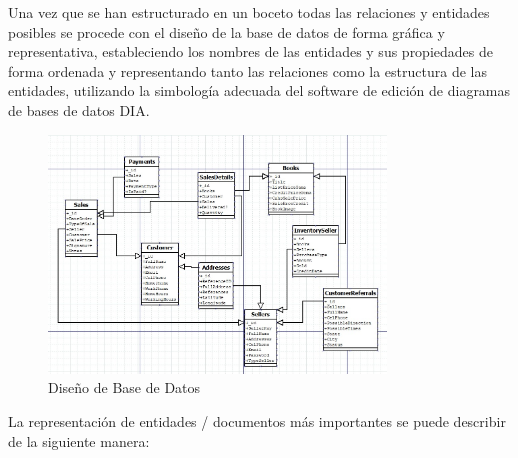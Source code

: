 \documentclass[runningheads]{llncs}
\begin{document}
                Una vez que se han estructurado en un boceto todas las relaciones y entidades posibles se procede con el diseño de la base de datos de forma gráfica y representativa, estableciendo los nombres de las entidades y sus propiedades de forma ordenada y representando tanto las relaciones como la estructura de las entidades, utilizando la simbología adecuada del software de edición de diagramas de bases de datos DIA.
                \begin{figure}[H]
                    \centering\captionsetup{width=0.8\textwidth}
                    \includegraphics[width=0.8\textwidth]{figures/db_diagrams/DB Diagram.jpg}
                    \caption{Diseño de Base de Datos} \label{fig8}
                \end{figure}
                La representación de entidades / documentos más importantes se puede describir de la siguiente manera:
\end{document}
